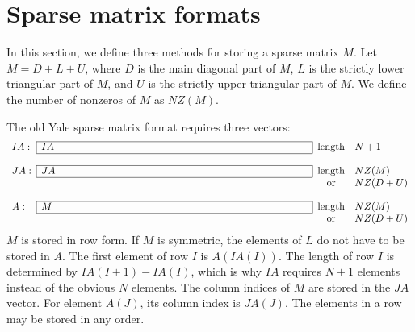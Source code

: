 
\section{Sparse matrix formats}
\label{Sec:SparseMatrixFormats}
 
In this section, we define three methods for storing a sparse matrix $M$.  Let
\mbox{$M = D + L + U$}, where $D$ is the main diagonal part of $M$, $L$ is the
strictly lower triangular part of $M$, and $U$ is the strictly upper
triangular part of $M$.  We define the number of nonzeros of $M$ as $NZ(M)$.
 
The old Yale sparse matrix format \cite{YSMP1,YSMP2} requires three vectors:
\[
\begin{array}{llcl}\cline{2-2}
IA:  & \multicolumn{1}{|l|}{IA\hspace*{0.9in}}
                                & {\rm length} & N + 1\\ \cline{2-2}
     &                          &              & \\ \cline{2-2}
JA:  & \multicolumn{1}{|l|}{JA\hspace*{3.5in}}
                                & {\rm length} & NZ(M)\\ \cline{2-2}
     &                          & {\rm or}     & NZ(D+U)\\
     &                          &              & \\ \cline{2-2}
A:   & \multicolumn{1}{|l|}{M~\hspace*{3.5in}}
                                & {\rm length} & NZ(M)\\ \cline{2-2}
     &                          & {\rm or}     & NZ(D+U)
\end{array}
\]
$M$ is stored in row form.  If $M$ is symmetric, the elements of $L$ do
not have to be stored in $A$.  The first element of row $I$ is
$A(IA(I))$.  The length of row $I$ is determined by $IA(I+1)-IA(I)$,
which is why $IA$ requires $N+1$ elements instead of the obvious $N$
elements.  The column indices of $M$ are stored in the $JA$ vector.
For element $A(J)$, its column index is $JA(J)$.  The elements in a
row may be stored in any order.
 
